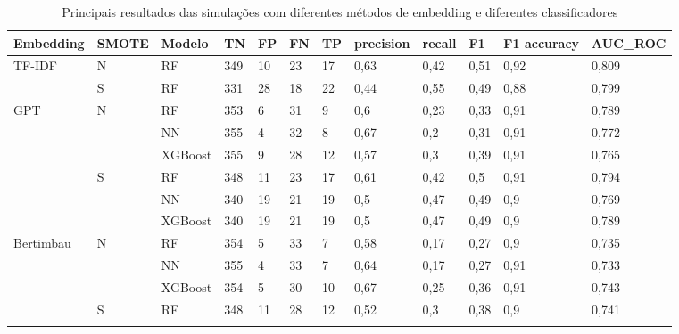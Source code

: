 \documentclass[conference]{IEEEtran}
\begin{document}
\begin{table}[t]
\centering
\caption{Principais resultados das simulações com diferentes métodos de embedding e diferentes classificadores}
\begin{tabular}{llllllllllll}
\hline
Embedding                          & SMOTE              & Modelo  & TN  & FP & FN & TP & precision & recall & F1 & F1 accuracy & AUC\_ROC \\ \hline
\multirow{2}{*}{TF-IDF}            & N                  & RF      & 349 & 10 & 23 & 17 & 0,63 & 0,42 & 0,51  & 0,92    & 0,809    \\ \cline{2-12} 
                                   & S                  & RF      & 331 & 28 & 18 & 22 & 0,44 & 0,55 & 0,49  & 0,88    & 0,799    \\ \hline
\multirow{6}{*}{GPT}               & \multirow{3}{*}{N} & RF      & 353 & 6  & 31 & 9  & 0,6  & 0,23 & 0,33  & 0,91    & 0,789    \\ \cline{3-12} 
                                   &                    & NN      & 355 & 4  & 32 & 8  & 0,67 & 0,2  & 0,31  & 0,91    & 0,772    \\ \cline{3-12} 
                                   &                    & XGBoost & 355 & 9  & 28 & 12 & 0,57 & 0,3  & 0,39  & 0,91    & 0,765    \\ \cline{2-12} 
                                   & \multirow{3}{*}{S} & RF      & 348 & 11 & 23 & 17 & 0,61 & 0,42 & 0,5   & 0,91    & 0,794    \\ \cline{3-12} 
                                   &                    & NN      & 340 & 19 & 21 & 19 & 0,5  & 0,47 & 0,49  & 0,9     & 0,769    \\ \cline{3-12} 
                                   &                    & XGBoost & 340 & 19 & 21 & 19 & 0,5  & 0,47 & 0,49  & 0,9     & 0,789    \\ \hline
\multirow{6}{*}{Bertimbau}         & \multirow{3}{*}{N} & RF      & 354 & 5  & 33 & 7  & 0,58 & 0,17 & 0,27  & 0,9     & 0,735    \\ \cline{3-12} 
                                   &                    & NN      & 355 & 4  & 33 & 7  & 0,64 & 0,17 & 0,27  & 0,91    & 0,733    \\ \cline{3-12} 
                                   &                    & XGBoost & 354 & 5  & 30 & 10 & 0,67 & 0,25 & 0,36  & 0,91    & 0,743    \\ \cline{2-12} 
                                   & \multirow{3}{*}{S} & RF      & 348 & 11 & 28 & 12 & 0,52 & 0,3  & 0,38  & 0,9     & 0,741    \\ \cline{3-12} 

\end{tabular}
\end{table}
\end{document}
